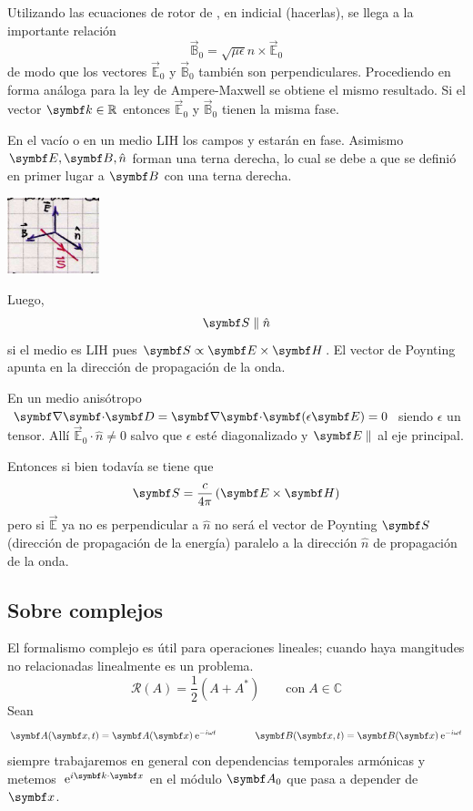 \documentclass[10pt,oneside]{CBFT_book}
\begin{document}
Utilizando las ecuaciones de rotor de , en indicial (hacerlas), se llega a la importante 
relación 
\[
	\vec{\mathbb{B}}_0 = \sqrt{\mu\epsilon} \hat{n} \times \vec{\mathbb{E}}_0
\]
de modo que los vectores $\vec{\mathbb{E}}_0$ y $\vec{\mathbb{B}}_0$ también son perpendiculares.
Procediendo en forma análoga para la ley de Ampere-Maxwell se obtiene el mismo resultado.
Si el vector $\vb{k} \in \mathbb{R}$ entonces $\vec{\mathbb{E}}_0$ y $\vec{\mathbb{B}}_0$
tienen la misma fase.

En el vacío o en un medio LIH los campos  y  estarán en fase.
Asimismo $\vb{E}, \vb{B}, \hat{n}$ forman una terna derecha, lo cual se debe a que se definió
en primer lugar a $\vb{B}$ con una terna derecha. 

\includegraphics[width=0.2\textwidth]{images/fig_ft1_ondas_pic.jpg}

Luego,
\[
	\vb{S} \parallel \hat{n}
\]
si el medio es LIH pues $\vb{S} \propto \pv{E}{H} $. El vector de Poynting apunta en la
dirección de propagación de la onda.

En un medio anisótropo $\divem{D}=\divem{}(\epsilon \vb{E}) = 0$ siendo $\epsilon$ un tensor.
Allí $\vec{\mathbb{E}}_0 \cdot \hat{n} \neq 0$ salvo que $\epsilon$ esté diagonalizado y
$\vb{E} \parallel$ al eje principal.

Entonces si bien todavía se tiene que
\[
	\vb{S} = \frac{c}{4\pi} \left( \pv{E}{H} \right)
\]
pero si  $\vec{\mathbb{E}} $ ya no es perpendicular a $\hat{n}$ no será el vector de Poynting
$\vb{S}$ (dirección de propagación de la energía) paralelo a la dirección $\hat{n}$ de propagación 
de la onda.


\subsection{Sobre complejos}

El formalismo complejo es útil para operaciones lineales; cuando haya mangitudes no relacionadas
linealmente es un problema.
\[
	\mathcal{R}(A) = \frac{1}{2}( A + A^* )	\qquad \text{con} \; A \in \mathbb{C}
\]
Sean 
\[
	\vb{A}(\vb{x},t) = \vb{A}(\vb{x})\euler^{-i\omega t} \qquad \qquad 
			\vb{B}(\vb{x},t) = \vb{B}(\vb{x})\euler^{-i\omega t}
\]
siempre trabajaremos en general con dependencias temporales armónicas y metemos $\euler^{i\pe{k}{x}}$
en el módulo $\vb{A}_0$ que pasa a depender de $\vb{x}$.
\end{document}
